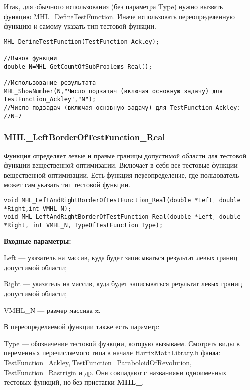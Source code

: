 \documentclass[a4paper,12pt]{article}
\begin{document}
Итак, для обычного использования (без параметра Type) нужно вызвать функцию MHL\_DefineTestFunction. Иначе использовать переопределенную функцию и самому указать тип тестовой функции.


\begin{lstlisting}[label=code_use_MHL_GetCountOfSubProblems_Real,caption=Пример использования]
MHL_DefineTestFunction(TestFunction_Ackley);

//Вызов функции
double N=MHL_GetCountOfSubProblems_Real();

//Использование результата
MHL_ShowNumber(N,"Число подзадач (включая основную задачу) для TestFunction_Ackley","N");
//Число подзадач (включая основную задачу) для TestFunction_Ackley:
//N=7
\end{lstlisting}

\subsubsection{MHL\_LeftBorderOfTestFunction\_Real}\label{MHL_LeftBorderOfTestFunction_Real}

Функция определяет левые и правые границы допустимой области для тестовой функции вещественной оптимизации. Включает в себя все тестовые функции вещественной оптимизации. Есть функция-переопределение, где пользователь может сам указать тип тестовой функции.


\begin{lstlisting}[label=code_syntax_MHL_LeftBorderOfTestFunction_Real,caption=Синтаксис]
void MHL_LeftAndRightBorderOfTestFunction_Real(double *Left, double *Right,int VMHL_N);
void MHL_LeftAndRightBorderOfTestFunction_Real(double *Left, double *Right, int VMHL_N, TypeOfTestFunction Type);
\end{lstlisting}

\textbf{Входные параметры:}

Left --- указатель на массив, куда будет записываться результат левых границ допустимой области;

Right --- указатель на массив, куда будет записываться результат левых границ допустимой области;
	 
VMHL\_N --- размер массива x.

В переопределяемой функции также есть параметр:
  
Type --- обозначение тестовой функции, которую вызываем.
Смотреть виды в переменных перечисляемого типа в начале HarrixMathLibrary.h файла: TestFunction\_Ackley, TestFunction\_ParaboloidOfRevolution, TestFunction\_Rastrigin и др. Они совпадают с названиями одноименных тестовых функций, но без приставки \textbf{MHL\_}.
\end{document}
